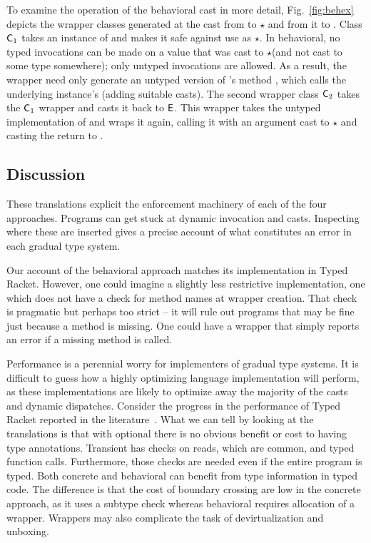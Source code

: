 \documentclass[a4paper,USenglish]{lipics-v2018}
\newcommand{\EM}[1]{\ensuremath{#1}\xspace}
\newcommand{\xt}[1]{{\sf{#1}}}
\newcommand{\EMxt}[1]{\EM{\xt{#1}}}
\newcommand{\E}{\EMxt {E}}
\newcommand{\any}{\EM{\star}}
\newcommand{\figref}[1]{Fig.~\ref{#1}\xspace}
\newcounter{lem}
\newcounter{conds}
\newcounter{cond}[conds]
\begin{document}
To examine the operation of the behavioral cast in more detail,
\figref{fig:behex} depicts the wrapper classes generated at the cast
from \C to \any and from it to \xt E. Class $\C_1$ takes an instance of \C
and makes it safe against use as \any. In behavioral, no typed invocations
can be made on a value that was cast to \any (and not cast to some type
somewhere); only untyped invocations are allowed. As a result, the wrapper
need only generate an untyped version of \C's method \a, which calls the
underlying \C instance's \a (adding suitable casts). The second wrapper
class $\C_2$ takes the $\C_1$ wrapper and casts it back to \E. This wrapper
takes the untyped implementation of \a and wraps it again, calling it with
an argument cast to \any and casting the return to \D.


\subsection{Discussion}

These translations explicit the enforcement machinery of each of the four
approaches. Programs can get stuck at dynamic invocation and
casts. Inspecting where these are inserted gives a precise account of what
constitutes an error in each gradual type system.

Our account of the behavioral approach matches its implementation in Typed
Racket. However, one could imagine a slightly less restrictive implementation,
one which does not have a check for method names at wrapper creation. That
check is pragmatic but perhaps too strict -- it will rule out programs that
may be fine just because a method is missing. One could have a wrapper that
simply reports an error if a missing method is called.

Performance is a perennial worry for implementers of gradual type systems.
It is difficult to guess how a highly optimizing language
implementation will perform, as these implementations are likely to optimize
away the majority of the casts and dynamic dispatches. Consider the progress
in the performance of Typed Racket reported in the
literature~\cite{popl16,OnlyMostly}. What we can tell by looking at the
translations is that with optional there is no obvious benefit or cost to
having type annotations. Transient has checks on reads, which are common,
and typed function calls. Furthermore, those checks are needed even if the
entire program is typed. Both concrete and behavioral can benefit from type
information in typed code. The difference is that the cost of boundary
crossing are low in the concrete approach, as it uses a subtype check whereas
behavioral requires allocation of a wrapper. Wrappers 
may also complicate the task of devirtualization and unboxing.
\end{document}
